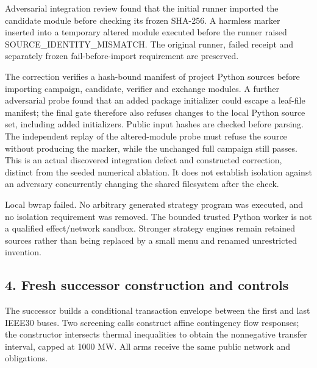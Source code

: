 \documentclass[
  10pt,
]{article}
\begin{document}
Adversarial integration review found that the initial runner imported
the candidate module before checking its frozen SHA-256. A harmless
marker inserted into a temporary altered module executed before the
runner raised SOURCE\_IDENTITY\_MISMATCH. The original runner, failed
receipt and separately frozen fail-before-import requirement are
preserved.

The correction verifies a hash-bound manifest of project Python sources
before importing campaign, candidate, verifier and exchange modules. A
further adversarial probe found that an added package initializer could
escape a leaf-file manifest; the final gate therefore also refuses
changes to the local Python source set, including added initializers.
Public input hashes are checked before parsing. The independent replay
of the altered-module probe must refuse the source without producing the
marker, while the unchanged full campaign still passes. This is an
actual discovered integration defect and constructed correction,
distinct from the seeded numerical ablation. It does not establish
isolation against an adversary concurrently changing the shared
filesystem after the check.

Local bwrap failed. No arbitrary generated strategy program was
executed, and no isolation requirement was removed. The bounded trusted
Python worker is not a qualified effect/network sandbox. Stronger
strategy engines remain retained sources rather than being replaced by a
small menu and renamed unrestricted invention.

\hypertarget{fresh-successor-construction-and-controls}{%
\subsection{4. Fresh successor construction and
controls}\label{fresh-successor-construction-and-controls}}

The successor builds a conditional transaction envelope between the
first and last IEEE30 buses. Two screening calls construct affine
contingency flow responses; the constructor intersects thermal
inequalities to obtain the nonnegative transfer interval, capped at 1000
MW. All arms receive the same public network and obligations.
\end{document}
